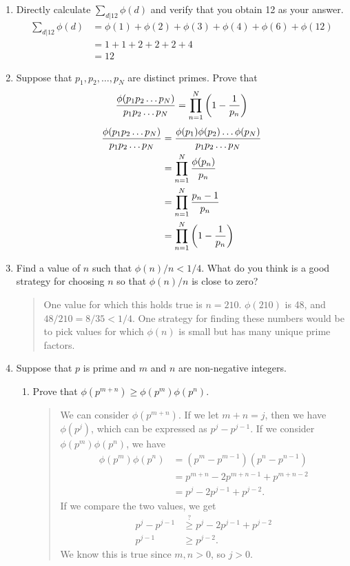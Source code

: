 \documentclass{hw}
\begin{document}

\begin{enumerate}
\item Directly calculate $\displaystyle\sum\limits_{d|12}\phi(d)$ and verify that you obtain 12 as your
answer.
\begin{align*}
\sum_{d|12}\phi(d) &= \phi(1) + \phi(2) + \phi(3) + \phi(4) + \phi(6) + \phi(12)\\
&= 1 + 1 + 2 + 2 + 2 + 4\\
&= 12
\end{align*}

\item Suppose that $p_{1},p_{2},\dots,p_{N}$ are distinct primes. Prove that
\[
{\phi(p_{1}p_{2}\dots p_{N}) \over p_{1}p_{2}\dots p_{N}}
=
\prod_{n=1}^{N}\left(1-{1\over p_{n}}\right)
\]
\begin{align*}
{\phi(p_{1}p_{2}\dots p_{N}) \over p_{1}p_{2}\dots p_{N}} &=
{\phi(p_{1})\phi(p_{2})\dots \phi(p_{N}) \over p_{1}p_{2}\dots p_{N}}\\
&= \prod_{n=1}^{N}{\phi(p_{n})\over p_{n}}\\
&= \prod_{n=1}^{N}{p_{n} -1 \over p_{n}}\\
&= \prod_{n=1}^{N}\left(1-{1\over p_{n}}\right)
\end{align*}

\item Find a value of $n$ such that $\phi(n)/n < 1/4$. What do you think is a good strategy for
choosing $n$ so that $\phi(n)/n$ is close to zero?
\begin{quote}
One value for which this holds true is $n=210$. $\phi(210)$ is 48, and $48/210 = 8/35 < 1/4$. One
strategy for finding these numbers would be to pick values for which $\phi(n)$ is small but has
many unique prime factors.
\end{quote}

\item Suppose that $p$ is prime and $m$ and $n$ are non-negative integers.
\begin{enumerate}
\item Prove that $\phi(p^{m+n})\geq\phi(p^{m})\phi(p^{n})$.
\begin{quote}
We can consider $\phi(p^{m+n})$. If we let $m+n=j$, then we have $\phi(p^{j})$, which can be
expressed as $p^{j}-p^{j-1}$. If we consider $\phi(p^{m})\phi(p^{n})$, we have
\begin{align*}
\phi(p^{m})\phi(p^{n})&= (p^{m}-p^{m-1})(p^{n}-p^{n-1})\\
&= p^{m+n} - 2p^{m+n-1} + p^{m+n-2}\\
&= p^{j}-2p^{j-1}+p^{j-2}.
\end{align*}
If we compare the two values, we get
\begin{align*}
p^{j}-p^{j-1} &\stackrel{?}{\geq} p^{j}-2p^{j-1}+p^{j-2}\\
p^{j-1} &\geq p^{j-2}.
\end{align*}
We know this is true since $m,n>0$, so $j>0$.
\end{quote}


\end{enumerate}
\end{enumerate}
\end{document}
